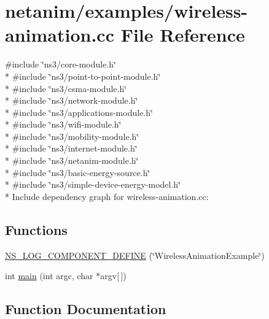 \hypertarget{wireless-animation_8cc}{}\section{netanim/examples/wireless-\/animation.cc File Reference}
\label{wireless-animation_8cc}
{\ttfamily \#include \char`\"{}ns3/core-\/module.\+h\char`\"{}}\\*
{\ttfamily \#include \char`\"{}ns3/point-\/to-\/point-\/module.\+h\char`\"{}}\\*
{\ttfamily \#include \char`\"{}ns3/csma-\/module.\+h\char`\"{}}\\*
{\ttfamily \#include \char`\"{}ns3/network-\/module.\+h\char`\"{}}\\*
{\ttfamily \#include \char`\"{}ns3/applications-\/module.\+h\char`\"{}}\\*
{\ttfamily \#include \char`\"{}ns3/wifi-\/module.\+h\char`\"{}}\\*
{\ttfamily \#include \char`\"{}ns3/mobility-\/module.\+h\char`\"{}}\\*
{\ttfamily \#include \char`\"{}ns3/internet-\/module.\+h\char`\"{}}\\*
{\ttfamily \#include \char`\"{}ns3/netanim-\/module.\+h\char`\"{}}\\*
{\ttfamily \#include \char`\"{}ns3/basic-\/energy-\/source.\+h\char`\"{}}\\*
{\ttfamily \#include \char`\"{}ns3/simple-\/device-\/energy-\/model.\+h\char`\"{}}\\*
Include dependency graph for wireless-\/animation.cc\+:
\subsection*{Functions}
\begin{DoxyCompactItemize}
\item 
\hyperlink{wireless-animation_8cc_aeb7f78291377f97302156f274c764278}{N\+S\+\_\+\+L\+O\+G\+\_\+\+C\+O\+M\+P\+O\+N\+E\+N\+T\+\_\+\+D\+E\+F\+I\+NE} (\char`\"{}Wireless\+Animation\+Example\char`\"{})
\item 
int \hyperlink{wireless-animation_8cc_a0ddf1224851353fc92bfbff6f499fa97}{main} (int argc, char $\ast$argv\mbox{[}$\,$\mbox{]})
\end{DoxyCompactItemize}


\subsection{Function Documentation}
